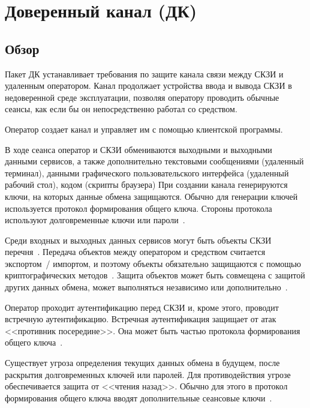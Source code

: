 \section{Доверенный канал (ДК)}\label{TC}

\subsection{Обзор}\label{TC.Intro}

Пакет ДК устанавливает требования по защите канала связи между СКЗИ и 
удаленным оператором. 
%
Канал продолжает устройства ввода и вывода СКЗИ в недоверенной среде 
эксплуатации, позволяя оператору проводить обычные сеансы,
как если бы он непосредственно работал со средством.

Оператор создает канал и управляет им с помощью клиентской программы. 

В ходе сеанса оператор и СКЗИ обмениваются выходными и выходными данными 
сервисов, а также дополнительно текстовыми сообщениями (удаленный терминал),  
данными графического пользовательского интерфейса (удаленный рабочий стол),
кодом (скрипты браузера) 
%
При создании канала генерируются ключи, на которых данные обмена защищаются. 
Обычно для генерации ключей используется протокол формирования общего 
ключа. Стороны протокола используют долговременные ключи или 
пароли~.

Среди входных и выходных данных сервисов могут быть объекты СКЗИ 
перечня~. Передача объектов между оператором и средством 
считается экспортом~/ импортом, и поэтому объекты обязательно защищаются с помощью 
криптографических методов~. Защита объектов 
может быть совмещена с защитой других данных обмена, может выполняться 
независимо или дополнительно~.

Оператор проходит аутентификацию перед СКЗИ и, кроме этого, проводит встречную 
аутентификацию. Встречная аутентификация защищает от атак <<противник 
посередине>>. Она может быть частью протокола формирования общего 
ключа~.

Существует угроза определения текущих данных обмена в будущем, после раскрытия 
долговременных ключей или паролей. Для противодействия угрозе обеспечивается 
защита от <<чтения назад>>. Обычно для этого в протокол формирования общего ключа
вводят дополнительные сеансовые ключи~. 

